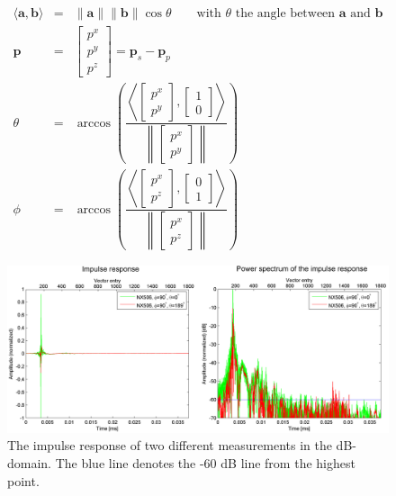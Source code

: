 \begin{eqnarray}
\label{eq:innerproduct}
\langle\mathbf{a},\mathbf{b}\rangle&=&\|\mathbf{a}\|\|\mathbf{b}\|\cos\theta\qquad\text{with }\theta\text{ the angle between }\mathbf{a}\text{ and }\mathbf{b}\\
\mathbf{p}&=&\left[\begin{array}{c}
p^x\\
p^y\\
p^z
\end{array}\right]=\mathbf{p}_s-\mathbf{p}_p\\
\label{eq:theta}
\theta&=&\arccos\left(
\dfrac{\left\langle\left[\begin{array}{c}
p^x\\
p^y
\end{array}\right],\left[\begin{array}{c}
1\\
0
\end{array}\right]\right\rangle}
{\left\|\left[\begin{array}{c}
p^x\\
p^y
\end{array}
\right]\right\|}
\right)\\
\label{eq:phi}
\phi&=&\arccos\left(
\dfrac{\left\langle\left[\begin{array}{c}
p^x\\
p^z
\end{array}\right],\left[\begin{array}{c}
0\\
1
\end{array}\right]\right\rangle}
{\left\|\left[\begin{array}{c}
p^x\\
p^z
\end{array}
\right]\right\|}
\right)
\end{eqnarray}

\vspace{1in}

\begin{figure}[h!]
	\centering
	\includegraphics[width=\textwidth]{afbeeldingen/plots/impulse_response_length.png}
	\caption[Impulse response in decibel-domain]{The impulse response of two different measurements in the dB-domain. The blue line denotes the -60 dB line from the highest point.}
	\label{fig:impulse_length}
\end{figure}